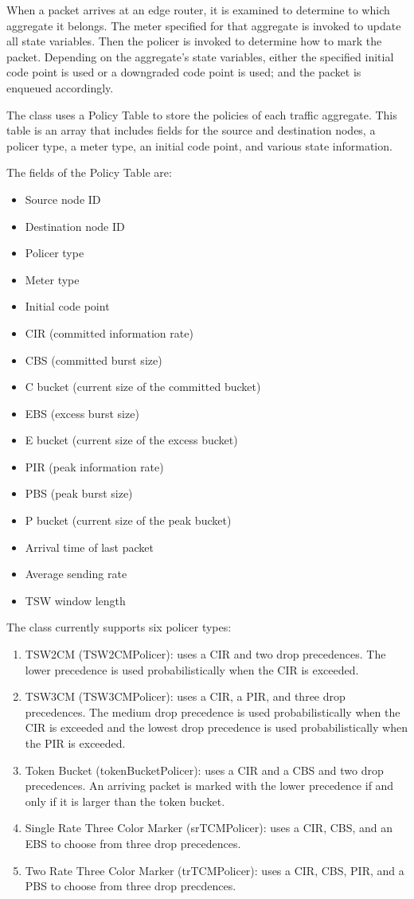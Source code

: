 When a packet arrives at an edge router, it is examined to determine to which 
aggregate it belongs.  The meter specified for that aggregate is invoked to 
update all state variables.  Then the policer is invoked to determine how to 
mark the packet.  Depending on the aggregate's state variables, either the 
specified initial code point is used or a downgraded code point is used; and 
the packet is enqueued accordingly.

The  class uses a Policy Table to store the policies of each 
traffic aggregate.  This table is an array that includes fields for the 
source and destination nodes, a policer type, a meter type, an initial code 
point, and various state information.

The fields of the Policy Table are:
\begin{itemize}
\item
Source node ID
\item
Destination node ID
\item
Policer type
\item
Meter type
\item
Initial code point
\item
CIR (committed information rate)
\item
CBS (committed burst size)
\item
C bucket (current size of the committed bucket)
\item
EBS (excess burst size)
\item
E bucket (current size of the excess bucket)
\item
PIR (peak information rate)
\item
PBS (peak burst size)
\item
P bucket (current size of the peak bucket)
\item
Arrival time of last packet
\item
Average sending rate
\item
TSW window length
\end{itemize}

The  class currently supports six policer types:
\begin{enumerate}
\item
TSW2CM (TSW2CMPolicer): uses a CIR and two drop precedences.  The lower precedence is used probabilistically when the CIR is exceeded.
\item
TSW3CM (TSW3CMPolicer): uses a CIR, a PIR, and three drop precedences.  The medium drop precedence is used probabilistically when the CIR is exceeded and the lowest drop precedence is used probabilistically when the PIR is exceeded.
\item
Token Bucket (tokenBucketPolicer): uses a CIR and a CBS and two drop precedences.  An arriving packet is marked with the lower precedence if and only if it is larger than the token bucket.
\item
Single Rate Three Color Marker (srTCMPolicer): uses a CIR, CBS, and an EBS to choose from three drop precedences.
\item
Two Rate Three Color Marker (trTCMPolicer): uses a CIR, CBS, PIR, and a PBS to choose from three drop precdences.

\end{enumerate}

